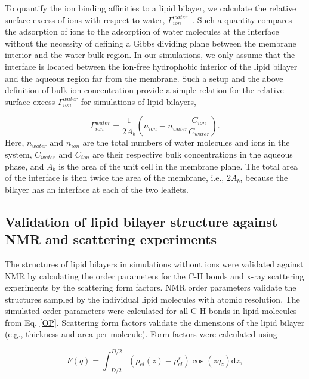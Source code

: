 \documentclass[aip,jcp,twocolumn]{revtex4}
\begin{document}
To quantify the ion binding affinities to a lipid bilayer, we calculate the relative surface excess of ions with respect to water, $\Gamma_{ion}^{water}$~\cite{chattorajBOOK}. Such a quantity compares the adsorption of ions to the adsorption of water molecules at the interface without the necessity of defining a Gibbs dividing plane between the membrane interior and the water bulk region. In our simulations, we only assume that the interface is located between the ion-free hydrophobic interior of the lipid bilayer and the aqueous region far from the membrane.  Such a setup and the above definition of bulk ion concentration provide a simple relation for the relative surface excess $\Gamma_{ion}^{water}$ for simulations of lipid bilayers,
 
\begin{equation}\label{surfexcess}
  \Gamma_{ion}^{water}=\frac{1}{2A_b} \left ( n_{ion} - n_{water} \frac{C_{ion}}{C_{water}} \right ).
\end{equation}
Here, $n_{water}$ and $n_{ion}$ are the total numbers of water molecules and ions in the system,
$C_{water}$ and $C_{ion}$ are their respective bulk concentrations in the aqueous phase,
and $A_b$ is the area of the unit cell in the membrane plane.
The total area of the interface is then twice the area of the membrane, i.e., $2A_b$,
because the bilayer has an interface at each of the two leaflets.



\subsection{Validation of lipid bilayer structure against NMR and scattering experiments}
The structures of lipid bilayers in simulations without ions were validated against NMR by calculating the order parameters for the C-H bonds and \mbox{x-ray} scattering experiments by the scattering form factors. NMR order parameters validate the structures sampled by the individual lipid molecules with atomic resolution. The simulated order parameters were calculated for all C-H bonds in lipid molecules from Eq. \ref{OP}. Scattering form factors validate the dimensions of the lipid bilayer (e.g., thickness and area per molecule). Form factors were calculated using

\begin{equation}
  F(q) = \int _{-D/2} ^{D/2} \left ( \rho_{el}(z) - \rho_{el}^s \right ) \cos (zq_z) \mathrm{d}z,
\end{equation}
\end{document}
